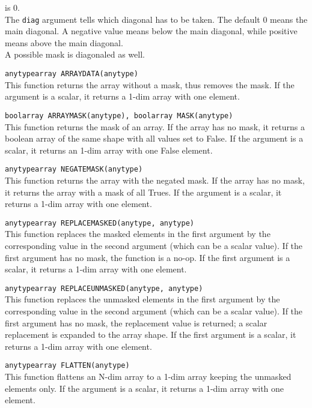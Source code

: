 \begin{description}
    is 0.
    \\The \texttt{diag} argument tells which diagonal has to be
    taken. The default 0 means the main diagonal. A negative value means
    below the main diagonal, while positive means above the main diagonal.
    \\A possible mask is diagonaled as well.
 \item[] \texttt{anytypearray ARRAYDATA(anytype)}\\
    This function returns the array without a mask, thus removes the mask.
    If the argument is a scalar, it returns a 1-dim array with one element.
  \item[] \texttt{boolarray ARRAYMASK(anytype), boolarray MASK(anytype)}\\
    This function returns the mask of an array. If the array has no
    mask, it returns a boolean array of the same shape with all values
    set to False.
    If the argument is a scalar, it returns an 1-dim array with one False
    element.
 \item[] \texttt{anytypearray NEGATEMASK(anytype)}\\
    This function returns the array with the negated mask. If the array has
    no mask, it returns the array with a mask of all Trues.
    If the argument is a scalar, it returns a 1-dim array with one element.
 \item[] \texttt{anytypearray REPLACEMASKED(anytype, anytype)}\\
    This function replaces the masked elements in the first argument
    by the corresponding value in the second argument (which can be a
    scalar value).
    If the first argument has no mask, the function is a no-op.
    If the first argument is a scalar, it returns a 1-dim array with one element.
 \item[] \texttt{anytypearray REPLACEUNMASKED(anytype, anytype)}\\
    This function replaces the unmasked elements in the first argument
    by the corresponding value in the second argument (which can be a
    scalar value).
    If the first argument has no mask, the replacement value is
    returned; a scalar replacement is expanded to the array shape.
    If the first argument is a scalar, it returns a 1-dim array with one element.
  \item[] \texttt{anytypearray FLATTEN(anytype)}\\
    This function flattens an N-dim array to a 1-dim array keeping the
    unmasked elements only.
    If the argument is a scalar, it returns a 1-dim array with one element.
\end{description}


